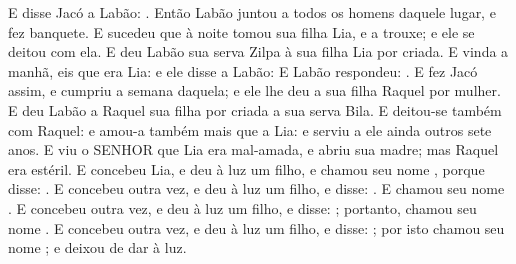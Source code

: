 {{E disse Jacó a Labão: .
Então Labão juntou a todos os homens daquele lugar, e fez banquete.
E sucedeu que à noite tomou sua filha Lia, e a trouxe; e ele se deitou com ela.
E deu Labão sua serva Zilpa à sua filha Lia por criada.
E vinda a manhã, eis que era Lia: e ele disse a Labão: 
E Labão respondeu: .
E fez Jacó assim, e cumpriu a semana daquela; e ele lhe deu a sua filha Raquel por mulher.
E deu Labão a Raquel sua filha por criada a sua serva Bila.
E deitou-se também com Raquel: e amou-a também mais que a Lia: e serviu a ele ainda outros sete anos.
E viu o SENHOR que Lia era mal-amada, e abriu sua madre; mas Raquel era estéril.
E concebeu Lia, e deu à luz um filho, e chamou seu nome , porque disse: .
E concebeu outra vez, e deu à luz um filho, e disse: . E chamou seu nome .
E concebeu outra vez, e deu à luz um filho, e disse: ; portanto, chamou seu nome .
E concebeu outra vez, e deu à luz um filho, e disse: ; por isto chamou seu nome ; e deixou de dar à luz.

\par}

}
